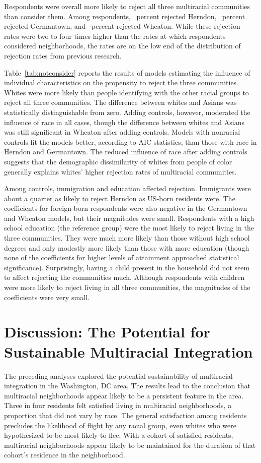 \documentclass{baderart}
\begin{document}
Respondents were overall more likely to reject all three multiracial communities than consider them. Among respondents, \ncherndon~percent rejected Herndon, \ncgermantown~percent rejected Germantown, and \ncwheaton~percent rejected Wheaton. While these rejection rates were two to four times higher than the rates at which respondents considered neighborhoods, the rates are on the low end of the distribution of rejection rates from previous research. 

Table~\ref{tab:notconsider} reports the results of models estimating the influence of individual characteristics on the propensity to reject the three communities. Whites were more likely than people identifying with the other racial groups to reject all three communities. The difference between whites and Asians was statistically distinguishable from zero. Adding controls, however, moderated the influence of race in all cases, though the difference between whites and Asians was still significant in Wheaton after adding controls. Models with nonracial controls fit the models better, according to AIC statistics, than those with race in Herndon and Germantown. The reduced influence of race after adding controls suggests that the demographic dissimilarity of whites from people of color generally explains whites' higher rejection rates of multiracial communities. 


Among controls, immigration and education affected rejection. Immigrants were about a quarter as likely to reject Herndon as US-born residents were. The coefficients for foreign-born respondents were also negative in the Germantown and Wheaton models, but their magnitudes were small. Respondents with a high school education (the reference group) were the most likely to reject living in the three communities. They were much more likely than those without high school degrees and only modestly more likely than those with more education (though none of the coefficients for higher levels of attainment approached statistical significance). Surprisingly, having a child present in the household did not seem to affect rejecting the communities much. Although respondents with children were more likely to reject living in all three communities, the magnitudes of the coefficients were very small.  

\section{Discussion: The Potential for Sustainable Multiracial Integration}
The preceding analyses explored the potential sustainability of multiracial integration in the Washington, DC area. The results lead to the conclusion that multiracial neighborhoods appear likely to be a persistent feature in the area. Three in four residents felt satisfied living in multiracial neighborhoods, a proportion that did not vary by race. The general satisfaction among residents precludes the likelihood of flight by any racial group, even whites who were hypothesized to be most likely to flee. With a cohort of satisfied residents, multiracial neighborhoods appear likely to be maintained for the duration of that cohort's residence in the neighborhood.
\end{document}
